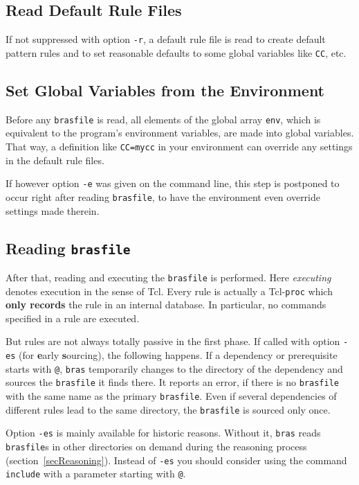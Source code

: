 \documentclass[12pt]{article}
\newcommand{\bras}{\texttt{bras}}
\begin{document}
\subsection{Read Default Rule Files}
If not suppressed with option \texttt{-r}, a default rule file is read
to create default pattern rules and to set reasonable defaults to some
global variables like \texttt{CC}, etc.

\subsection{Set Global Variables from the Environment}

Before any \texttt{brasfile} is read, all elements of the global array
\texttt{env}, which is equivalent to the program's environment
variables, are made into global variables. That way, a definition like
\texttt{CC=mycc} in your environment can override any settings in the
default rule files.

If however option \texttt{-e} was given on the command line, this step
is postponed to occur right after reading \texttt{brasfile}, to have
the environment even override settings made therein.

\subsection{Reading \texttt{brasfile}}

After that, reading and executing the \texttt{brasfile} is performed.
Here \textit{executing} denotes execution in the sense of Tcl. Every
rule is actually a Tcl-\texttt{proc} which \textbf{only records} the
rule in an internal database. In particular, no commands specified in
a rule are executed.

But rules are not always totally passive in the first phase. 
If called with option \texttt{-es} (for \textbf{e}arly
\textbf{s}ourcing), the following happens.
If a dependency or prerequisite starts with \texttt{@}, \bras{}
temporarily changes to the directory of the dependency and sources the
\texttt{brasfile} it finds there. It reports an error, if there is no
\texttt{brasfile} with the same name as the primary
\texttt{brasfile}. Even if several dependencies of different rules lead
to the same directory, the \texttt{brasfile} is sourced only once.

Option \texttt{-es} is mainly available for historic reasons. Without
it, \bras{} reads \texttt{brasfile}s in other directories on demand
during the reasoning process (section~\ref{secReasoning}). Instead of
\texttt{-es} you should consider using the command \texttt{include}
with a parameter starting with \texttt{@}.
\end{document}

